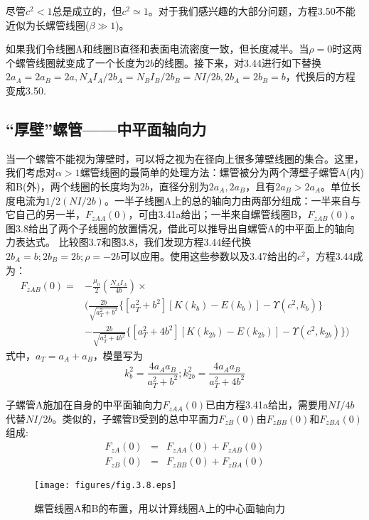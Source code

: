 尽管$c^2<1$总是成立的，但$c^2\simeq 1$。对于我们感兴趣的大部分问题，方程3.50不能近似为长螺管线圈($\beta\gg 1$)。

如果我们令线圈A和线圈B直径和表面电流密度一致，但长度减半。当$\rho=0$时这两个螺管线圈就变成了一个长度为$2b$的线圈。接下来，对3.44进行如下替换$2a_A=2a_B=
2a, N_A I_A/2b_A = N_B I_B/2b_B = NI/2b,2b_A = 2b_B = b$，代换后的方程变成3.50.

\subsection{“厚壁”螺管——中平面轴向力}
当一个螺管不能视为薄壁时，可以将之视为在径向上很多薄壁线圈的集合。这里，我们考虑对$\alpha>1$螺管线圈的最简单的处理方法：螺管被分为两个薄壁子螺管A(内)和B(外)，两个线圈的长度均为$2b$，直径分别为$2a_A,2a_B$，且有$2a_B >2a_A$。单位长度电流为$1/2(NI/2b)$。一半子线圈A上的总的轴向力由两部分组成：一半来自与它自己的另一半，$F_{zAA}(0)$，可由3.41a给出；一半来自螺管线圈B，$F_{zAB}(0)$。图3.8给出了两个子线圈的放置情况，借此可以推导出自螺管A的中平面上的轴向力表达式。
比较图3.7和图3.8，我们发现方程3.44经代换$2b_A = b; 2b_B = 2b; \rho = −2b$可以应用。使用这些参数以及3.47给出的$c^2$，方程3.44成为：
\begin{equation}
\begin{split}
F_{zAB}(0)=&-\frac{\mu_0}{2}(\frac{N_A I_A}{4b})\times \\
&( \frac{2b}{\sqrt{a_T^2+b^2}} \{[a_T^2+b^2][K(k_{b})-E(k_{b})]-\Upsilon(c^2,k_b)\}\\
&-\frac{2b}{\sqrt{a_T^2+4b^2}} \{[a_T^2+4b^2][K(k_{2b})-E(k_{2b})]-\Upsilon(c^2,k_{2b}) \})
\end{split}
\end{equation}
式中，$a_T=a_A+a_B$，模量写为
$$k_{b}^2=\frac{4a_A a_B}{a_T^2+b^2} ; k_{2b}^2=\frac{4a_A a_B}{a_T^2+4b^2} $$

子螺管A施加在自身的中平面轴向力$F_{zAA}(0)$已由方程3.41a给出，需要用$NI/4b$代替$NI/2b$。类似的，子螺管B受到的总中平面力$F_{zB}(0)$由$F_{zBB}(0)$和$F_{zBA}(0)$组成:
\begin{eqnarray}
  F_{zA}(0) &=& F_{zAA}(0)+F_{zAB}(0) \\ \nonumber
  F_{zB}(0) &=& F_{zBB}(0)+F_{zBA}(0)
\end{eqnarray}

\begin{figure}[htbp]
  \centering
 \texttt{[image: figures/fig.3.8.eps]}
  \caption{螺管线圈A和B的布置，用以计算线圈A上的中心面轴向力}
\end{figure}

